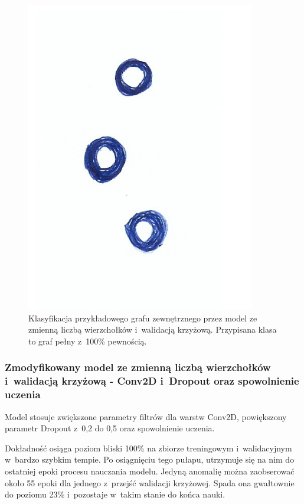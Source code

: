 \begin{figure}[ht]
	\centering
	\includegraphics[width=10cm]{../graph_classification/test_graphs/drawn/empty-5.png}
	\caption{Klasyfikacja przykładowego grafu zewnętrznego przez model ze zmienną liczbą wierzchołków i~walidacją krzyżową.
		Przypisana klasa to graf pełny z~100\% pewnością.}
	\label{Fig:tests-csvar-0d}
\end{figure}
\FloatBarrier

\subsubsection{Zmodyfikowany model ze zmienną liczbą wierzchołków i~walidacją krzyżową - Conv2D i~Dropout oraz spowolnienie uczenia}

Model stosuje zwiększone parametry filtrów dla warstw Conv2D, powiększony parametr Dropout z~0,2 do 0,5
oraz spowolnienie uczenia.

Dokładność osiąga poziom bliski 100\% na zbiorze treningowym i~walidacyjnym w~bardzo szybkim tempie.
Po osiągnięciu tego pułapu, utrzymuje się na nim do ostatniej epoki procesu nauczania modelu.
Jedyną anomalię można zaobserować około 55 epoki dla jednego z~przejść walidacji krzyżowej.
Spada ona gwałtownie do poziomu 23\% i~pozostaje w~takim stanie do końca nauki.

